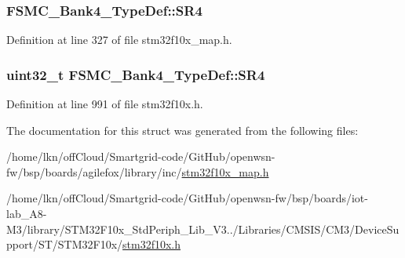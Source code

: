 \subsubsection[{\texorpdfstring{S\+R4}{SR4}}]{ F\+S\+M\+C\+\_\+\+Bank4\+\_\+\+Type\+Def\+::\+S\+R4}\hypertarget{struct_f_s_m_c___bank4___type_def_a3f85877aa8af4fbdb40e3e54a2575b48}{}\label{struct_f_s_m_c___bank4___type_def_a3f85877aa8af4fbdb40e3e54a2575b48}


Definition at line 327 of file stm32f10x\+\_\+map.\+h.

\subsubsection[{\texorpdfstring{S\+R4}{SR4}}]{ {\bf uint32\+\_\+t} F\+S\+M\+C\+\_\+\+Bank4\+\_\+\+Type\+Def\+::\+S\+R4}\hypertarget{struct_f_s_m_c___bank4___type_def_a1e0f09be7fa48bb7b14233866da1dd9f}{}\label{struct_f_s_m_c___bank4___type_def_a1e0f09be7fa48bb7b14233866da1dd9f}


Definition at line 991 of file stm32f10x.\+h.



The documentation for this struct was generated from the following files\+:\begin{DoxyCompactItemize}
\item 
/home/lkn/off\+Cloud/\+Smartgrid-\/code/\+Git\+Hub/openwsn-\/fw/bsp/boards/agilefox/library/inc/\hyperlink{agilefox_2library_2inc_2stm32f10x__map_8h}{stm32f10x\+\_\+map.\+h}\item 
/home/lkn/off\+Cloud/\+Smartgrid-\/code/\+Git\+Hub/openwsn-\/fw/bsp/boards/iot-\/lab\+\_\+\+A8-\/\+M3/library/\+S\+T\+M32\+F10x\+\_\+\+Std\+Periph\+\_\+\+Lib\+\_\+\+V3../\+Libraries/\+C\+M\+S\+I\+S/\+C\+M3/\+Device\+Support/\+S\+T/\+S\+T\+M32\+F10x/\hyperlink{iot-lab___a8-_m3_2library_2_s_t_m32_f10x___std_periph___lib___v3_85_80_2_libraries_2_c_m_s_i_s_26497265545392eb5694b064ae15018db}{stm32f10x.\+h}\end{DoxyCompactItemize}
